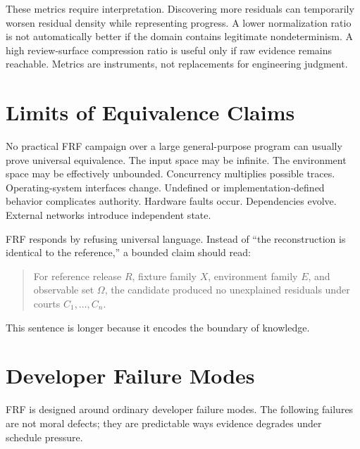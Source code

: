 \documentclass[11pt,a4paper]{article}
\newcommand{\frf}{\textsc{FRF}}
\begin{document}
These metrics require interpretation. Discovering more residuals can temporarily worsen residual density while representing progress. A lower normalization ratio is not automatically better if the domain contains legitimate nondeterminism. A high review-surface compression ratio is useful only if raw evidence remains reachable. Metrics are instruments, not replacements for engineering judgment.

\section{Limits of Equivalence Claims}
\label{sec:limits}

No practical \frf{} campaign over a large general-purpose program can usually prove universal equivalence. The input space may be infinite. The environment space may be effectively unbounded. Concurrency multiplies possible traces. Operating-system interfaces change. Undefined or implementation-defined behavior complicates authority. Hardware faults occur. Dependencies evolve. External networks introduce independent state.

\frf{} responds by refusing universal language. Instead of ``the reconstruction is identical to the reference,'' a bounded claim should read:
\begin{quote}
For reference release \(R\), fixture family \(X\), environment family \(E\), and observable set \(\Omega\), the candidate produced no unexplained residuals under courts \(C_1,\ldots,C_n\).
\end{quote}

This sentence is longer because it encodes the boundary of knowledge.

\section{Developer Failure Modes}
\label{sec:failure-modes}

\frf{} is designed around ordinary developer failure modes. The following failures are not moral defects; they are predictable ways evidence degrades under schedule pressure.
\end{document}
